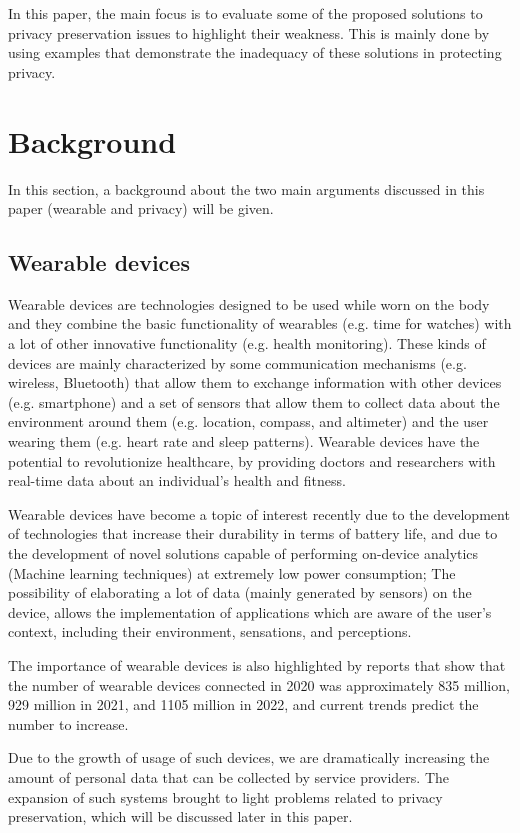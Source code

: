\documentclass{article}
\begin{document}
In this paper, the main focus is to evaluate some of the proposed solutions to privacy preservation issues to highlight their weakness. This is mainly done by using examples that demonstrate the inadequacy of these solutions in protecting privacy.

\section{Background}
In this section, a background about the two main arguments discussed in this paper (wearable and privacy) will be given.
\subsection{Wearable devices}
Wearable devices are technologies designed to be used while worn on the body and they combine the basic functionality of wearables (e.g. time for watches) with a lot of other innovative functionality (e.g. health monitoring). These kinds of devices are mainly characterized by some communication mechanisms (e.g. wireless, Bluetooth) that allow them to exchange information with other devices (e.g. smartphone) and a set of sensors that allow them to collect data about the environment around them (e.g. location, compass, and altimeter) and the user wearing them (e.g. heart rate and sleep patterns). Wearable devices have the potential to revolutionize healthcare, by providing doctors and researchers with real-time data about an individual's health and fitness.\cite{seneviratne_survey_2017}

Wearable devices have become a topic of interest recently due to the development of technologies that increase their durability in terms of battery life, and due to the development of novel solutions capable of performing on-device analytics \cite{seneviratne_survey_2017} (Machine learning techniques) at extremely low power consumption; The possibility of elaborating a lot of data (mainly generated by sensors) on the device, allows the implementation of applications which are aware of the user’s context, including their environment, sensations, and perceptions.

The importance of wearable devices is also highlighted by reports that show that the number of wearable devices connected in 2020 was approximately 835 million, 929 million in 2021, and 1105 million in 2022, and current trends predict the number to increase. \cite{noauthor_global_nodate}

Due to the growth of usage of such devices, we are dramatically increasing the amount of personal data that can be collected by service providers. The expansion of such systems brought to light problems related to privacy preservation, which will be discussed later in this paper.
\end{document}

